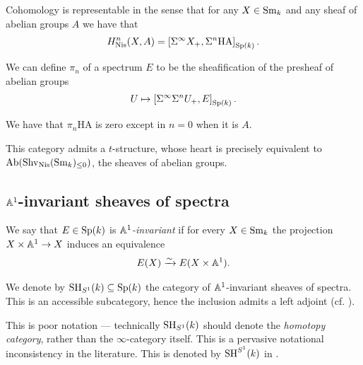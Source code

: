 \documentclass[11pt,openany]{book}
\providecommand{\HA}{\mathrm{HA}}
\begin{document}
\begin{proposition}\label{prop:cohom-representable-in-sheaves-of-spectra} 
Cohomology is representable in the sense that for any $X \in \mathrm{Sm}_k$ and any sheaf of abelian groups $A$ we have that
\begin{align*}
    H^n_\Nis(X,A) = \left[ \Sigma^\infty X_+, \Sigma^n\HA \right]_{\Sp(k)}.
\end{align*}
\end{proposition}


We can define $\pi_n$ of a spectrum $E$ to be the sheafification of the presheaf of abelian groups
\begin{align*}
    U \mapsto \left[ \Sigma^\infty \Sigma^n U_+, E \right]_{\mathrm{Sp}(k)}.
\end{align*}
%

\begin{example} We have that $\pi_n \HA$ is zero except in $n=0$ when it is $A$.
\end{example}

\begin{remark} This category admits a $t$-structure, whose heart is precisely equivalent to $\mathrm{Ab}(\mathrm{Shv}_{\mathrm{Nis}}(\mathrm{Sm}_k)_{\le 0})$, the sheaves of abelian groups.
\end{remark}


\subsection{$\mathbb{A}^1$-invariant sheaves of spectra}

\begin{definition} We say that $E \in \mathrm{Sp}(k)$ is $\mathbb{A}^1$\textit{-invariant} if for every $X \in \mathrm{Sm}_k$ the projection $X \times \mathbb{A}^1 \to X$ induces an equivalence
\begin{align*}
     E(X)\xrightarrow{\sim} E(X \times \mathbb{A}^1).
\end{align*}
\end{definition}

\begin{proposition} We denote by $\mathrm{SH}_{S^1}(k) \subseteq \mathrm{Sp}(k)$ the category of $\mathbb{A}^1$-invariant sheaves of spectra. This is an accessible subcategory, hence the inclusion admits a left adjoint (cf. \cite[4.2.1]{Morel-connectivity}).
\end{proposition}

\begin{remark} This is poor notation --- technically $\mathrm{SH}_{S^1}(k)$ should denote the \textit{homotopy category}, rather than the $\infty$-category itself. This is a pervasive notational inconsistency in the literature. This is denoted by $\mathrm{SH}^{S^1}(k)$ in \cite[3.2.1]{Morel-pi0}.
\end{remark}
\end{document}
